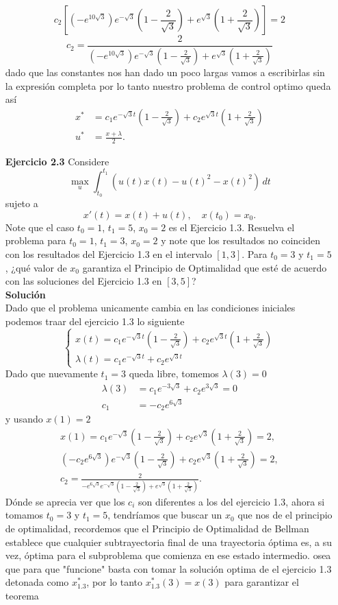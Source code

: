 \documentclass{uofa-eng-assignment}
\begin{document}
\begin{enumerate}
\[
c_2[(- e^{10\sqrt{3}})e^{-\sqrt{3}}\left(1-\frac{2}{\sqrt{3}}\right)
+  e^{\sqrt{3}}\left(1+\frac{2}{\sqrt{3}}\right)]=2
\]
\[
c_2= \frac{2}{(- e^{10\sqrt{3}})e^{-\sqrt{3}}\left(1-\frac{2}{\sqrt{3}}\right)
+  e^{\sqrt{3}}\left(1+\frac{2}{\sqrt{3}}\right)}
\]
dado que las constantes nos han dado un poco largas vamos a escribirlas sin la expresión completa por lo tanto nuestro problema de control optimo queda así
\begin{align*}
    x^*&=c_1 e^{-\sqrt{3}t}\left(1-\frac{2}{\sqrt{3}}\right)+ c_2 e^{\sqrt{3}t}\left(1+\frac{2}{\sqrt{3}}\right)\\
    u^*&=\frac{x+\lambda}{2}.
\end{align*}
\item [\textbf{Ejercicio 2.3}] Considere
    \[
    \max_u \int_{t_0}^{t_1} \left( u(t)x(t) - u(t)^2 - x(t)^2 \right) \, dt
    \]
    sujeto a 
    \[
    x'(t) = x(t) + u(t), \quad x(t_0) = x_0.
    \]
    Note que el caso $t_0 = 1$, $t_1 = 5$, $x_0 = 2$ es el Ejercicio 1.3. Resuelva el problema para $t_0 = 1$, $t_1 = 3$, $x_0 = 2$ y note que los resultados no coinciden con los resultados del Ejercicio 1.3 en el intervalo $[1,3]$. Para $t_0 = 3$ y $t_1 = 5$, ¿qué valor de $x_0$ garantiza el Principio de Optimalidad que esté de acuerdo con las soluciones del Ejercicio 1.3 en $[3,5]$?\\
\textbf{Solución}\\
Dado que el problema unicamente cambia en las condiciones iniciales podemos traar del ejercicio 1.3 lo siguiente
\[
\begin{cases}
x(t)=c_1 e^{-\sqrt{3}t}\left(1-\frac{2}{\sqrt{3}}\right)
+ c_2 e^{\sqrt{3}t}\left(1+\frac{2}{\sqrt{3}}\right) \\[6pt]
\lambda(t)=c_1 e^{-\sqrt{3}t}+c_2 e^{\sqrt{3}t}
\end{cases}
\]
Dado que nuevamente $t_1=3$ queda libre, tomemos $\lambda(3)=0$
\begin{align*}
\lambda(3)&=c_1 e^{-3\sqrt{3}}+c_2 e^{3\sqrt{3}}=0\\
c_1 &=-c_2 e^{6\sqrt{3}}
\end{align*}
y usando $x(1)=2$
\begin{align*}
    x(1)=c_1 e^{-\sqrt{3}}\left(1-\frac{2}{\sqrt{3}}\right)
+ c_2 e^{\sqrt{3}}\left(1+\frac{2}{\sqrt{3}}\right) =2,\\
(-c_2 e^{6\sqrt{3}})e^{-\sqrt{3}}\left(1-\frac{2}{\sqrt{3}}\right)
+ c_2 e^{\sqrt{3}}\left(1+\frac{2}{\sqrt{3}}\right)=2 ,\\
c_2= \frac{2}{-e^{6\sqrt{3}}e^{-\sqrt{3}}\left(1-\frac{2}{\sqrt{3}}\right)
+  e^{\sqrt{3}}\left(1+\frac{2}{\sqrt{3}}\right)}.
\end{align*}
Dónde se aprecia ver que los $c_i$ son diferentes a los del ejercicio 1.3, ahora si tomamos $t_0=3$ y $t_1=5$, tendríamos que buscar un $x_0$ que nos de el principio de optimalidad, recordemos que el Principio de Optimalidad de Bellman establece que cualquier subtrayectoria final de una trayectoria óptima es, a su vez, óptima para el subproblema que comienza en ese estado intermedio. osea que para que "funcione" basta con tomar la solución optima de el ejercicio 1.3 detonada como $x_{1.3}^*$, por lo tanto $x_{1.3}^*(3)=x(3)$ para garantizar el teorema


\end{enumerate}
\end{document}
